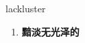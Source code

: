
\begin{frame}
{\huge lackluster}
\begin{center}
\begin{enumerate}\Large
  \item \textbf{黯淡无光泽的}
\end{enumerate}
\end{center}
\end{frame}
